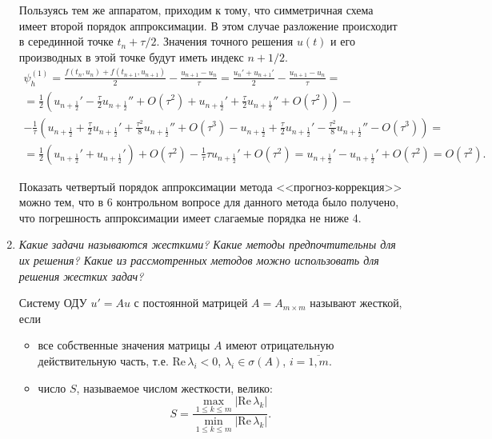\documentclass[12pt, a4paper]{article}
\begin{document}
\begin{enumerate}
		Пользуясь тем же аппаратом, приходим к тому, что симметричная схема имеет второй порядок аппроксимации. В этом случае разложение происходит в серединной точке $t_n + \tau/2$. Значения точного решения $u(t)$ и его производных в этой точке будут иметь индекс $n+1/2$.
		\begin{multline*}
			\psi_h^{(1)} = \frac{f(t_n, u_n) + f(t_{n+1}, u_{n+1})}2 - \frac{u_{n+1} - u_n}\tau = \frac{u_n' + u_{n+1}'}2 - \frac{u_{n+1} - u_n}\tau = \\
			= \frac12\left(u_{n+\frac12}' - \frac\tau2 u_{n+\frac12}'' + O(\tau^2) + u_{n+\frac12}' + \frac\tau2 u_{n+\frac12}'' + O(\tau^2)\right) - \\
			- \frac1\tau \left( u_{n+\frac12} + \frac\tau2 u_{n+\frac12}' + \frac{\tau^2}8 u_{n+\frac12}'' + O(\tau^3)  - u_{n+\frac12} + \frac\tau2 u_{n+\frac12}' - \frac{\tau^2}8 u_{n+\frac12}'' - O(\tau^3)\right) = \\
			= \frac12\left(u_{n+\frac12}' + u_{n+\frac12}'\right)  + O(\tau^2) - \frac1\tau \tau u_{n+\frac12}' + O(\tau^2) = u_{n+\frac12}' - u_{n+\frac12}' + O(\tau^2) = O(\tau^2).
		\end{multline*}
		
		
		Показать четвертый порядок аппроксимации метода <<прогноз-коррекция>> можно тем, что в 6 контрольном вопросе для данного метода было получено, что погрешность аппроксимации имеет слагаемые порядка не ниже 4.
		
		\item \textit{Какие задачи называются жесткими? Какие методы предпочтительны для их решения? Какие из рассмотренных методов можно использовать для решения жестких задач?}
		\smallskip
		
		Систему ОДУ $u' = A u$ с постоянной матрицей $A = A_{m\times m}$ называют жесткой, если
		\begin{itemize}
			\item все собственные значения матрицы $A$ имеют отрицательную действительную часть, т.е. $\mathrm{Re}\,\lambda_i < 0$, $\lambda_i \in \sigma(A)$, $i = \overline{1, m}$.
			\item число $S$, называемое числом жесткости, велико:
			\[
			S = \frac{\max\limits_{1 \le k \le m} |\mathrm{Re}\,\lambda_k|}{\min\limits_{1 \le k \le m} |\mathrm{Re}\,\lambda_k|}.
			\]
		\end{itemize}
		

\end{enumerate}
\end{document}
